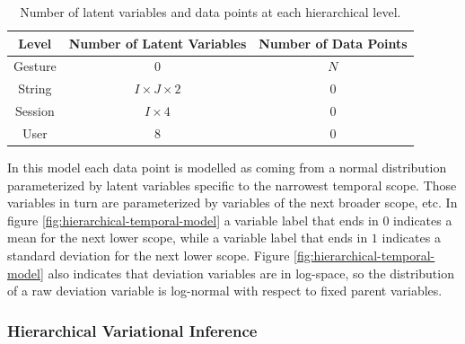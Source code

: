 \begin{table}[h]
    \centering
    \renewcommand{\arraystretch}{1.4}
    \begin{tabular}{|c|c|c|}
        \hline
        \textbf{Level} & \textbf{Number of Latent Variables} & \textbf{Number of Data Points} \\
        \hline
        Gesture        & 0 & $N$ \\
        String         & $I \times J \times 2$ & 0 \\
        Session        & $I \times 4$ & 0 \\
        User           & 8 & 0 \\
        \hline
    \end{tabular}
    \caption{Number of latent variables and data points at each hierarchical level.}
\end{table}

In this model each data point is modelled as coming from 
a normal distribution parameterized by latent variables
specific to the narrowest temporal scope. Those variables
in turn are parameterized by variables of the next broader scope,
etc. In figure \ref{fig:hierarchical-temporal-model} 
a variable label that ends in $0$ indicates a mean for the 
next lower scope, while a variable label that ends in $1$ indicates
a standard deviation for the next lower scope.
Figure \ref{fig:hierarchical-temporal-model} also indicates
that deviation variables are in log-space, so the
distribution of a raw deviation variable is log-normal
with respect to fixed parent variables.

\subsubsection{Hierarchical Variational Inference}

